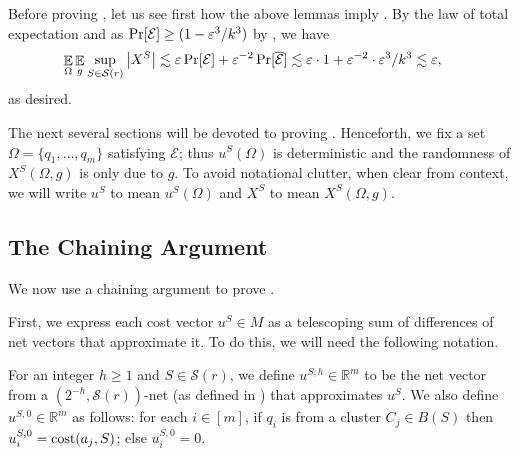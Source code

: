 \documentclass[11pt]{article}
\theoremstyle{restate}
\theoremstyle{definition}
\newcommand{\eps}{\ensuremath{\varepsilon}}
\newcommand{\R}{\ensuremath{\mathbb{R}}}
\DeclareMathOperator*{\Prob}{\ensuremath{\textnormal{Pr}}}
\renewcommand{\Pr}{\Prob}
\newcommand{\E}{\mathop{\mathbb{E}}}
\newcommand{\cost}{\textnormal{cost}}
\newcommand{\uvec}[1]{u^{#1}} %
\newcommand{\uq}[2]{u^{#1}_{#2}} %
\newcommand{\csize}{m}
\newcommand{\inSR}{\in \mathcal{S}(r)}
\begin{document}
  Before proving , let us see first how the above lemmas imply . By the law of total expectation and as $\Pr[\mathcal{E}] \geq (1-\eps^3/k^3)$  by , we have
\begin{align*}
    \E_{\Omega} \E_g \sup_{S \inSR} \left\lvert X^S\right\rvert &\lesssim \eps \Pr[\mathcal{E}] + \eps^{-2} \Pr[\overline{\mathcal{E}}]  
    \lesssim \eps \cdot 1 + \eps^{-2} \cdot \eps^{3}/k^3 \lesssim \eps,
\end{align*}
as desired. 

The next several sections will be devoted to proving . Henceforth, we fix a set  $\Omega = \{q_1, \ldots, q_m\}$ satisfying $\mathcal{E}$; thus $u^S(\Omega)$ is deterministic and the randomness of $X^{S}(\Omega,g)$ is only due to $g$. To avoid notational clutter, when clear from context, we will write $u^S$ to mean $u^S(\Omega)$ and $X^S$ to mean $X^S(\Omega,g)$.



\subsection{The Chaining Argument}\label{sec: chaining}
We now use a chaining argument to prove .

First, we express each cost vector $u^{S} \in M$ as a telescoping sum of differences of net vectors that approximate it. To do this, we will need the following notation.

 For an integer $h \geq 1$ and $S \in \mathcal{S}(r)$, we define $u^{S,h} \in \R^{\csize}$ to be the net vector from a $(2^{-h}, \mathcal{S}(r))$-net (as defined in ) that approximates $\uvec{S}$. We also define $\uvec{S,0} \in \R^{\csize}$ as follows: for each  $i \in [m]$, if $q_i$ 
 is from a cluster $C_j \in B(S)$ then  $u^{S,0}_i = \cost(a_j,S)$; else $\uq{S,0}{i} = 0$.
\end{document}
